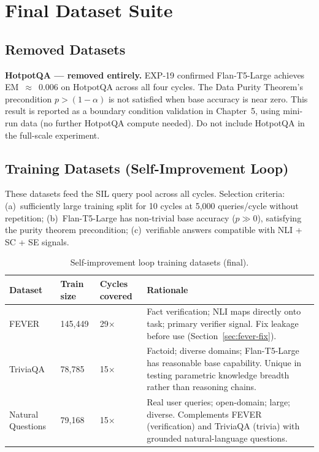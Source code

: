 \documentclass[12pt,a4paper]{article}
\begin{document}
\section{Final Dataset Suite}
\label{sec:datasets}

\subsection{Removed Datasets}

\textbf{HotpotQA --- removed entirely.}
EXP-19 confirmed Flan-T5-Large achieves EM~$\approx$~0.006 on HotpotQA across all
four cycles.
The Data Purity Theorem's precondition $p > (1-\alpha)$ is not satisfied when
base accuracy is near zero.
This result is reported as a boundary condition validation in Chapter~5, using
mini-run data (no further HotpotQA compute needed).
Do not include HotpotQA in the full-scale experiment.

\subsection{Training Datasets (Self-Improvement Loop)}

These datasets feed the SIL query pool across all cycles.
Selection criteria: (a)~sufficiently large training split for 10 cycles at 5,000
queries/cycle without repetition; (b)~Flan-T5-Large has non-trivial base accuracy
($p \gg 0$), satisfying the purity theorem precondition;
(c)~verifiable answers compatible with NLI + SC + SE signals.

\begin{table}[htbp]
\centering
\caption{Self-improvement loop training datasets (final).}
\label{tab:train-datasets}
\renewcommand{\arraystretch}{1.3}
\begin{tabular}{@{}p{2.8cm}p{1.8cm}p{2.0cm}p{6.0cm}@{}}
\toprule
\textbf{Dataset} & \textbf{Train size} & \textbf{Cycles covered} & \textbf{Rationale} \\
\midrule
FEVER & 145,449 & 29$\times$ & Fact verification; NLI maps directly onto task;
  primary verifier signal. Fix leakage before use (Section~\ref{sec:fever-fix}). \\
TriviaQA & 78,785 & 15$\times$ & Factoid; diverse domains; Flan-T5-Large has
  reasonable base capability. Unique in testing parametric knowledge breadth
  rather than reasoning chains. \\
Natural Questions & 79,168 & 15$\times$ & Real user queries; open-domain;
  large; diverse. Complements FEVER (verification) and TriviaQA (trivia)
  with grounded natural-language questions. \\
\bottomrule
\end{tabular}
\end{table}
\end{document}
